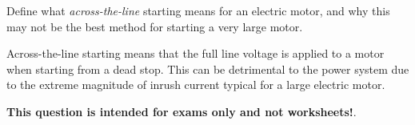 

Define what {\it across-the-line} starting means for an electric motor, and why this may not be the best method for starting a very large motor.







Across-the-line starting means that the full line voltage is applied to a motor when starting from a dead stop.  This can be detrimental to the power system due to the extreme magnitude of inrush current typical for a large electric motor.







{\bf This question is intended for exams only and not worksheets!}.




